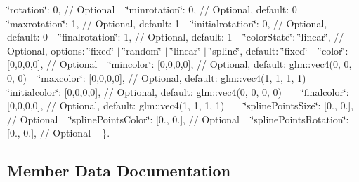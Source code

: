  \char`\"{}rotation\char`\"{}\+: 0, // Optional ~\newline
 \char`\"{}minrotation\char`\"{}\+: 0, // Optional, default\+: 0 ~\newline
 \char`\"{}maxrotation\char`\"{}\+: 1, // Optional, default\+: 1 ~\newline
 \char`\"{}initialrotation\char`\"{}\+: 0, // Optional, default\+: 0 ~\newline
 \char`\"{}finalrotation\char`\"{}\+: 1, // Optional, default\+: 1 ~\newline
 \char`\"{}color\+State\char`\"{}\+: \char`\"{}linear\char`\"{}, // Optional, options\+: \char`\"{}fixed\char`\"{} $\vert$ \char`\"{}random\char`\"{} $\vert$ \char`\"{}linear\char`\"{} $\vert$ \char`\"{}spline\char`\"{}, default\+: \char`\"{}fixed\char`\"{} ~\newline
 \char`\"{}color\char`\"{}\+: \mbox{[}0,0,0,0\mbox{]}, // Optional ~\newline
 \char`\"{}mincolor\char`\"{}\+: \mbox{[}0,0,0,0\mbox{]}, // Optional, default\+: glm\+::vec4(0, 0, 0, 0) ~\newline
 \char`\"{}maxcolor\char`\"{}\+: \mbox{[}0,0,0,0\mbox{]}, // Optional, default\+: glm\+::vec4(1, 1, 1, 1) ~\newline
 \char`\"{}initialcolor\char`\"{}\+: \mbox{[}0,0,0,0\mbox{]}, // Optional, default\+: glm\+::vec4(0, 0, 0, 0) ~\newline
 ~\newline
 \char`\"{}finalcolor\char`\"{}\+: \mbox{[}0,0,0,0\mbox{]}, // Optional, default\+: glm\+::vec4(1, 1, 1, 1) ~\newline
 ~\newline
 \char`\"{}spline\+Points\+Size\char`\"{}\+: \mbox{[}0., 0.\mbox{]}, // Optional ~\newline
 \char`\"{}spline\+Points\+Color\char`\"{}\+: \mbox{[}0., 0.\mbox{]}, // Optional ~\newline
 \char`\"{}spline\+Points\+Rotation\char`\"{}\+: \mbox{[}0., 0.\mbox{]}, // Optional ~\newline
 \}. 

\subsection{Member Data Documentation}
\hypertarget{class_mason_1_1_particle_descriptor_aea9d3bf8cd0eaf89a9d34ca698062280}{}\label{class_mason_1_1_particle_descriptor_aea9d3bf8cd0eaf89a9d34ca698062280} 
